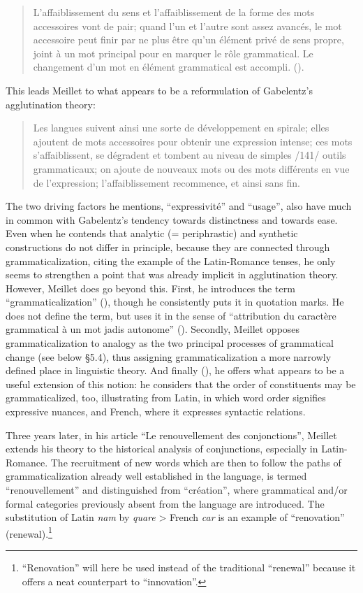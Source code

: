 \begin{quote}
L'affaiblissement du sens et l'affaiblissement de la forme des mots accessoires vont de pair; quand l'un et l'autre sont assez avancés, le mot accessoire peut finir par ne plus être qu'un élément privé de sens propre, joint à un mot principal pour en marquer le rôle grammatical. Le changement d'un mot en élément grammatical est accompli. (\citeyear[139]{Meillet1912}). \label{meillet}
\end{quote}

\noindent This leads Meillet to what appears to be a reformulation of Gabelentz's agglutination theory:

\begin{quote}
Les langues suivent ainsi une sorte de développement en spirale; elles ajou\-tent de mots accessoires pour obtenir une expression intense; ces mots s'affai\-blis\-sent, se dégradent et tombent au niveau de simples /141/ outils grammaticaux; on ajoute de nouveaux mots ou des mots différents en vue de l'expression; l'affaiblissement recommence, et ainsi sans fin.
\end{quote}

\noindent The two driving factors he mentions, “expressivité” and “usage”, also have much in common with Gabelentz's tendency towards distinctness and towards ease. Even when he contends that analytic (= periphrastic) and synthetic constructions do not differ in principle, because they are connected through grammaticalization, citing the example of the Latin-Romance tenses, he only seems to strengthen a point that was already implicit in agglutination theory. However, Meillet does go beyond this. First, he introduces the term ``grammaticalization'' (\citeyear[133]{Meillet1912}), though he consistently puts it in quotation marks. He does not define the term, but uses it in the sense of “attribution du caractère grammatical à un mot jadis autonome” (\citeyear[131]{Meillet1912}). Secondly, Meillet opposes grammaticalization to analogy as the two principal processes of grammatical change (see below §5.4), thus assigning grammaticalization a more narrowly defined place in linguistic theory. And finally (\citeyear[147f]{Meillet1912}), he offers what appears to be a useful extension of this notion: he considers that the order of constituents may be grammaticalized, too, illustrating from Latin, in which word order signifies expressive nuances, and French, where it expresses syntactic relations.

Three years later, in his article “Le renouvellement des conjonctions”, Meillet extends his theory to the historical analysis of conjunctions, especially in Latin-Romance. The recruitment of new words which are then to follow the paths of grammaticalization already well established in the language, is termed “renouvellement” and distinguished from “création”, where grammatical and/or formal categories previously absent from the language are introduced. The substitution of Latin \textit{nam} by \textit{quare} {\textgreater} French \textit{car} is an example of ``renovation'' (renewal).\footnote{``Renovation'' will here be used instead of the traditional ``renewal'' because it offers a neat counterpart to ``innovation''.}

